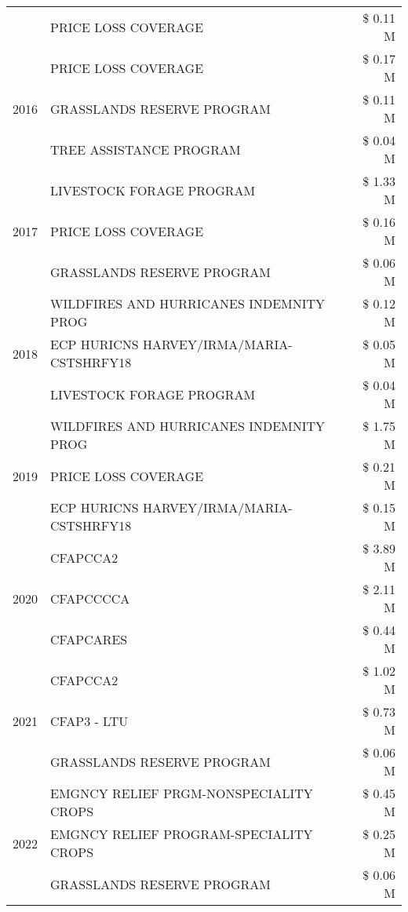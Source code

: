 \begin{tabular}{llr}
 & PRICE LOSS COVERAGE & \$ 0.11 M \\
\cline{1-3}
\multirow[t]{3}{*}{2016} & PRICE LOSS COVERAGE & \$ 0.17 M \\
 & GRASSLANDS RESERVE PROGRAM & \$ 0.11 M \\
 & TREE ASSISTANCE PROGRAM & \$ 0.04 M \\
\cline{1-3}
\multirow[t]{3}{*}{2017} & LIVESTOCK FORAGE PROGRAM & \$ 1.33 M \\
 & PRICE LOSS COVERAGE & \$ 0.16 M \\
 & GRASSLANDS RESERVE PROGRAM & \$ 0.06 M \\
\cline{1-3}
\multirow[t]{3}{*}{2018} & WILDFIRES AND HURRICANES INDEMNITY PROG & \$ 0.12 M \\
 & ECP HURICNS HARVEY/IRMA/MARIA-CSTSHRFY18 & \$ 0.05 M \\
 & LIVESTOCK FORAGE PROGRAM & \$ 0.04 M \\
\cline{1-3}
\multirow[t]{3}{*}{2019} & WILDFIRES AND HURRICANES INDEMNITY PROG & \$ 1.75 M \\
 & PRICE LOSS COVERAGE & \$ 0.21 M \\
 & ECP HURICNS HARVEY/IRMA/MARIA-CSTSHRFY18 & \$ 0.15 M \\
\cline{1-3}
\multirow[t]{3}{*}{2020} & CFAPCCA2 & \$ 3.89 M \\
 & CFAPCCCCA & \$ 2.11 M \\
 & CFAPCARES & \$ 0.44 M \\
\cline{1-3}
\multirow[t]{3}{*}{2021} & CFAPCCA2 & \$ 1.02 M \\
 & CFAP3 - LTU & \$ 0.73 M \\
 & GRASSLANDS RESERVE PROGRAM & \$ 0.06 M \\
\cline{1-3}
\multirow[t]{3}{*}{2022} & EMGNCY RELIEF PRGM-NONSPECIALITY CROPS & \$ 0.45 M \\
 & EMGNCY RELIEF PROGRAM-SPECIALITY CROPS & \$ 0.25 M \\
 & GRASSLANDS RESERVE PROGRAM & \$ 0.06 M \\
\cline{1-3}
\bottomrule
\end{tabular}
